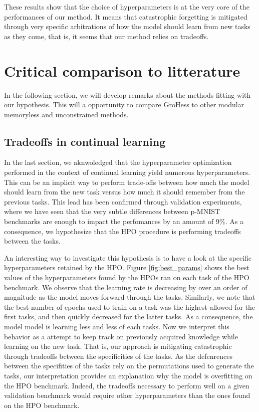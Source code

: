 \documentclass[11pt]{article}
\begin{document}
\vspace{1mm}
\noindent
These results show that the choice of hyperparameters is at the very core of the performances of our method. It means that catastrophic forgetting is mitigated through very specific arbitrations of how the model should learn from new tasks as they come, that is, it seems that our method relies on tradeoffs.



\section{Critical comparison to litterature}



In the following section, we will develop remarks about the methods fitting with our hypothesis. This will a opportunity to compare GroHess to other modular memoryless and unconstrained methods. 


\subsection{Tradeoffs in continual learning}


In the last section, we aknwoledged that the hyperparameter optimization performed in the context of continual learning yield numerous hyperparameters. This can be an implicit way to perform trade-offs between how much the model should learn from the new task versus how much it should remember from the previous tasks. This lead has been confirmed through validation experiments, where we have seen that the very subtle differences between p-MNIST benchmarks are enough to impact the perfomances by an amount of $9\%$. As a consequence, we hypothesize that the HPO procedure is performing tradeoffs between the tasks.

\vspace{2mm}
\noindent
An interesting way to investigate this hypothesis is to have a look at the specific hyperparameters retained by the HPO. Figure \ref{fig:best_params} shows the best values of the hyperparameters found by the HPOs ran on each task of the HPO benchmark. We observe that the learning rate is decreasing by over an order of magnitude as the model moves forward through the tasks. Similarly, we note that the best number of epochs used to train on a task was the highest allowed for the first tasks, and then quickly decreased for the latter tasks. As a consequence, the model model is learning less and less of each tasks. Now we interpret this behavior as a attempt to keep track on previously acquired knowledge while learning on the new task. That is, our approach is mitigating catastrophic through tradeoffs between the specificities of the tasks. As the defenrences between the specifities of the tasks rely on the permutations used to generate the tasks, our interpretation provides an explanation why the model is overfitting on the HPO benchmark. Indeed, the tradeoffs necessary to perform well on a given validation benchmark would require other hyperparameters than the ones found on the HPO benchmark.
\end{document}
